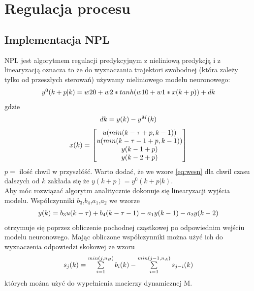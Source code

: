 \chapter{Regulacja procesu}
	\label{ch:reg}
	
	\section{Implementacja NPL}
		\label{sec:NPL}
		NPL jest algorytmem regulacji predykcyjnym z nieliniową predykcją i z linearyzacją oznacza to że do wyznaczania trajektori swobodnej (która zależy tylko od przeszłych sterowań) używamy nieliniowego modelu neuronowego:
		\begin{equation}
		\begin{tabular}{l}
		$y^0(k+p|k)=w20+w2*tanh(w10+w1*x(k+p))+dk$
		\end{tabular}
		\label{eq:NPL_y0}
		\end{equation}
		gdzie
		\begin{equation}
		\begin{tabular}{l}
		$dk = y(k)-y^M(k)$
		\end{tabular}
		\label{eq:dk}
		\end{equation}
		\begin{equation}
		\begin{tabular}{l}
		$x(k)=$ $\begin{bmatrix}u(min(k-\tau+p,k-1))\\u(min(k-\tau-1+p,k-1))\\y(k-1+p)\\y(k-2+p)\end{bmatrix}$
		\end{tabular}
		\label{eq:wesn}
		\end{equation}
		$p=$ ilość chwil w przyszłóść.
		Warto dodać, że we wzore \ref{eq:wesn} dla chwil czasu dalszych od $k$ zakłada się że $y(k+p)=y^0(k+p|k)$.\\
		Aby móc rozwiązać algorytm analitycznie dokonuje się linearyzacji wyjścia modelu. Współczynniki $b_3$,$b_4$,$a_1$,$a_2$ we wzorze
		\begin{equation}
		\begin{tabular}{l}
		$y(k)=b_3u(k-\tau)+b_4(k-\tau-1)-a_1y(k-1)-a_2y(k-2)$
		\end{tabular}
		\label{eq:NPL_wyjscielinear}
		\end{equation}
		otrzymuje się poprzez obliczenie pochodnej cząstkowej po odpowiednim wejściu modelu neuronowego. Mając obliczone współczynniki można użyć ich do wyznaczenia odpowiedzi skokowej ze wzoru
		\begin{equation}
		\begin{tabular}{l}
		$s_j(k)=\sum\limits_{i=1}^{min(j,n_B)}b_i(k)-\sum\limits_{i=1}^{min(j-1,n_A)}s_{j-i}(k)$
		\end{tabular}
		\label{eq:NPL_odpowiedzskok}
		\end{equation}
		których można użyć do wypełnienia macierzy dynamicznej M.
		
